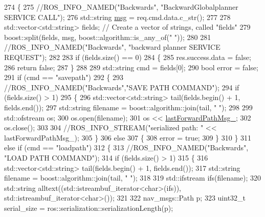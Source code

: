 \begin{DoxyCode}
274 \{
275     \textcolor{comment}{//ROS\_INFO\_NAMED("Backwards", "BackwardGlobalplanner SERVICE CALL");}
276     std::string \hyperlink{namespacekeyboard__node_a768777e12f75b89e4a0a60acf748e9eb}{msg} = req.cmd.data.c\_str();
277 
278     std::vector<std::string> fields; \textcolor{comment}{// Create a vector of strings, called "fields"}
279     boost::split(fields, msg, boost::algorithm::is\_any\_of(\textcolor{stringliteral}{" "}));
280 
281     \textcolor{comment}{//ROS\_INFO\_NAMED("Backwards", "backward planner SERVICE REQUEST");}
282 
283     \textcolor{keywordflow}{if} (fields.size() == 0)
284     \{
285         res.success.data = \textcolor{keyword}{false};
286         \textcolor{keywordflow}{return} \textcolor{keyword}{false};
287     \}
288 
289     std::string cmd = fields[0];
290     \textcolor{keywordtype}{bool} error = \textcolor{keyword}{false};
291     \textcolor{keywordflow}{if} (cmd == \textcolor{stringliteral}{"savepath"})
292     \{
293         \textcolor{comment}{//ROS\_INFO\_NAMED("Backwards","SAVE PATH COMMAND");}
294         \textcolor{keywordflow}{if} (fields.size() > 1)
295         \{
296             std::vector<std::string> tail(fields.begin() + 1, fields.end());
297             std::string filename = boost::algorithm::join(tail, \textcolor{stringliteral}{" "});
298 
299             std::ofstream os;
300             os.open(filename);
301             os << \hyperlink{classmove__base__z__client_1_1backward__global__planner_1_1BackwardGlobalPlanner_a058da13b9ee6b1d878830503e67de638}{lastForwardPathMsg\_};
302             os.close();
303 
304             \textcolor{comment}{//ROS\_INFO\_STREAM("serialized path: " << lastForwardPathMsg\_);}
305         \}
306         \textcolor{keywordflow}{else}
307         \{
308             error = \textcolor{keyword}{true};
309         \}
310     \}
311     \textcolor{keywordflow}{else} \textcolor{keywordflow}{if} (cmd == \textcolor{stringliteral}{"loadpath"})
312     \{
313         \textcolor{comment}{//ROS\_INFO\_NAMED("Backwards", "LOAD PATH COMMAND");}
314         \textcolor{keywordflow}{if} (fields.size() > 1)
315         \{
316             std::vector<std::string> tail(fields.begin() + 1, fields.end());
317             std::string filename = boost::algorithm::join(tail, \textcolor{stringliteral}{" "});
318 
319             std::ifstream ifs(filename);
320             std::string alltext((std::istreambuf\_iterator<char>(ifs)), std::istreambuf\_iterator<char>());
321 
322             nav\_msgs::Path p;
323             uint32\_t serial\_size = ros::serialization::serializationLength(p);

\end{DoxyCode}
